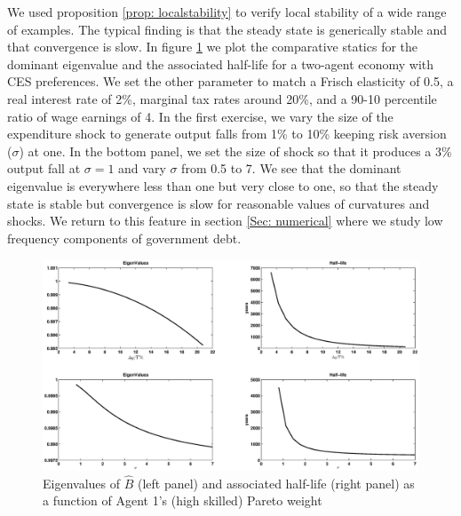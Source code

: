 \documentclass[thmsb,11pt]{article}
\begin{document}
We used proposition \ref{prop: localstability} to verify local stability of a wide range of examples. The typical finding is that the steady state is generically stable and that convergence is slow. In figure \ref{fig: Eigenvalues} we plot the comparative statics for the dominant eigenvalue and the associated  half-life for a two-agent economy with CES preferences. %
We set the other parameter to match a Frisch elasticity of 0.5,  a real interest rate of 2\%, marginal tax rates  around 20\%, and a 90-10 percentile ratio of wage earnings of 4. In the first 	exercise, we vary the size of the expenditure shock to generate output falls from 1\% to 10\% keeping risk aversion ($\sigma$) at one. In the bottom panel, we set the size of shock so that it produces a 3\% output fall at $\sigma=1$ and vary $\sigma$ from 0.5 to 7.
We see that the dominant eigenvalue is everywhere less than one but very close to one, so that the steady state is stable but convergence is slow for reasonable values of curvatures and shocks.  We return to this feature in section \ref{Sec: numerical} where we study low frequency components of government debt.
%
%


  \begin{figure}[htp]
 \centering
 \includegraphics[width=\textwidth]{Draft25Graphs/eigenvalues.eps}
 \caption{Eigenvalues of $\hat{B}$ (left panel) and associated half-life (right panel) as a function of Agent 1's (high skilled) Pareto weight}
 \label{fig: Eigenvalues}
 \end{figure}
\end{document}
